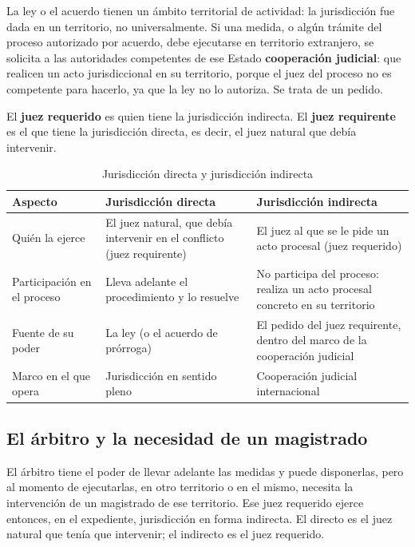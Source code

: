 \documentclass[12pt,oneside]{book}
\begin{document}
La ley o el acuerdo tienen un ámbito territorial de actividad: la jurisdicción fue dada en un territorio, no universalmente. Si una medida, o algún trámite del proceso autorizado por acuerdo, debe ejecutarse en territorio extranjero, se solicita a las autoridades competentes de ese Estado \textbf{cooperación judicial}: que realicen un acto jurisdiccional en su territorio, porque el juez del proceso no es competente para hacerlo, ya que la ley no lo autoriza. Se trata de un pedido.

El \textbf{juez requerido} es quien tiene la jurisdicción indirecta. El \textbf{juez requirente} es el que tiene la jurisdicción directa, es decir, el juez natural que debía intervenir.

\begin{table}[H]
\centering
\caption{Jurisdicción directa y jurisdicción indirecta}
\small
\begin{tabularx}{\textwidth}{>{\raggedright\arraybackslash}p{}YY}
\toprule
\textbf{Aspecto} & \textbf{Jurisdicción directa} & \textbf{Jurisdicción indirecta} \\
\midrule
Quién la ejerce & El juez natural, que debía intervenir en el conflicto (juez requirente) & El juez al que se le pide un acto procesal (juez requerido) \\
Participación en el proceso & Lleva adelante el procedimiento y lo resuelve & No participa del proceso: realiza un acto procesal concreto en su territorio \\
Fuente de su poder & La ley (o el acuerdo de prórroga) & El pedido del juez requirente, dentro del marco de la cooperación judicial \\
Marco en el que opera & Jurisdicción en sentido pleno & Cooperación judicial internacional \\
\bottomrule
\end{tabularx}
\end{table}

\subsection{El árbitro y la necesidad de un magistrado}

El árbitro tiene el poder de llevar adelante las medidas y puede disponerlas, pero al momento de ejecutarlas, en otro territorio o en el mismo, necesita la intervención de un magistrado de ese territorio. Ese juez requerido ejerce entonces, en el expediente, jurisdicción en forma indirecta. El directo es el juez natural que tenía que intervenir; el indirecto es el juez requerido.
\end{document}
